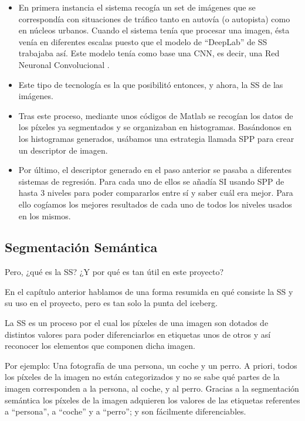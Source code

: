 \begin{itemize}
\item En primera instancia el sistema recogía un set de imágenes que se correspondía con situaciones de tráfico tanto en autovía (o autopista) como en núcleos urbanos. Cuando el sistema tenía que procesar una imagen, ésta venía en diferentes escalas puesto que el modelo de ``DeepLab'' de \ac{SS} trabajaba así. Este modelo tenía como base una \ac{CNN}, es decir, una Red Neuronal Convolucional \cite{cnn}.
 
\item Este tipo de tecnología es la que posibilitó entonces, y ahora, la \ac{SS} de las imágenes.

\item Tras este proceso, mediante unos códigos de Matlab se recogían los datos de los píxeles ya segmentados y se organizaban en histogramas. Basándonos en los histogramas generados, usábamos una estrategia llamada \ac{SPP} \cite{spp} para crear un descriptor de imagen.

\item Por último, el descriptor generado en el paso anterior se pasaba a diferentes sistemas de regresión. Para cada uno de ellos se añadía \ac{SI} \cite{spp} usando \ac{SPP} de hasta 3 niveles para poder compararlos entre sí y saber cuál era mejor. Para ello cogíamos los mejores resultados de cada uno de todos los niveles usados en los mismos.

\end{itemize}

\subsection{Segmentación Semántica}

Pero, ¿qué es la \ac{SS}? ¿Y por qué es tan útil en este proyecto?


En el capítulo anterior hablamos de una forma resumida en qué consiste la \ac{SS} y su uso en el proyecto, pero es tan solo la punta del iceberg.


La \ac{SS} es un proceso por el cual los píxeles de una imagen son dotados de distintos valores para poder diferenciarlos en etiquetas unos de otros y así reconocer los elementos que componen dicha imagen. 

Por ejemplo: Una fotografía de una persona, un coche y un perro. A priori, todos los píxeles de la imagen no están categorizados y no se sabe qué partes de la imagen corresponden a la persona, al coche, y al perro. Gracias a la segmentación semántica los píxeles de la imagen adquieren los valores de las etiquetas referentes a ``persona'', a ``coche'' y a ``perro''; y son fácilmente diferenciables.

